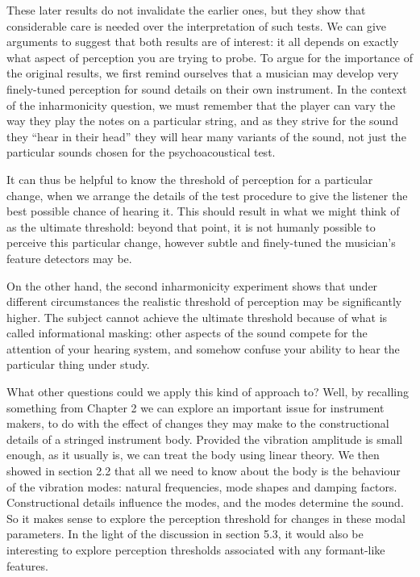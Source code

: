  These later results do not invalidate the earlier ones, but they show that 
  considerable care is needed over the interpretation of such tests. We can 
  give arguments to suggest that both results are of interest: it all depends 
  on exactly what aspect of perception you are trying to probe. To argue for 
  the importance of the original results, we first remind ourselves that a 
  musician may develop very finely-tuned perception for sound details on their 
  own instrument. In the context of the inharmonicity question, we must 
  remember that the player can vary the way they play the notes on a particular 
  string, and as they strive for the sound they ``hear in their head'' they 
  will hear many variants of the sound, not just the particular sounds chosen 
  for the psychoacoustical test. 

  It can thus be helpful to know the threshold of perception for a particular 
  change, when we arrange the details of the test procedure to give the 
  listener the best possible chance of hearing it. This should result in what 
  we might think of as the ultimate threshold: beyond that point, it is not 
  humanly possible to perceive this particular change, however subtle and 
  finely-tuned the musician’s feature detectors may be. 

  On the other hand, the second inharmonicity experiment shows that under 
  different circumstances the realistic threshold of perception may be 
  significantly higher. The subject cannot achieve the ultimate threshold 
  because of what is called informational masking: other aspects of the sound 
  compete for the attention of your hearing system, and somehow confuse your 
  ability to hear the particular thing under study. 

  What other questions could we apply this kind of approach to? Well, by 
  recalling something from Chapter 2 we can explore an important issue for 
  instrument makers, to do with the effect of changes they may make to the 
  constructional details of a stringed instrument body. Provided the vibration 
  amplitude is small enough, as it usually is, we can treat the body using 
  linear theory. We then showed in section 2.2 that all we need to know about 
  the body is the behaviour of the vibration modes: natural frequencies, mode 
  shapes and damping factors. Constructional details influence the modes, and 
  the modes determine the sound. So it makes sense to explore the perception 
  threshold for changes in these modal parameters. In the light of the 
  discussion in section 5.3, it would also be interesting to explore perception 
  thresholds associated with any formant-like features. 

